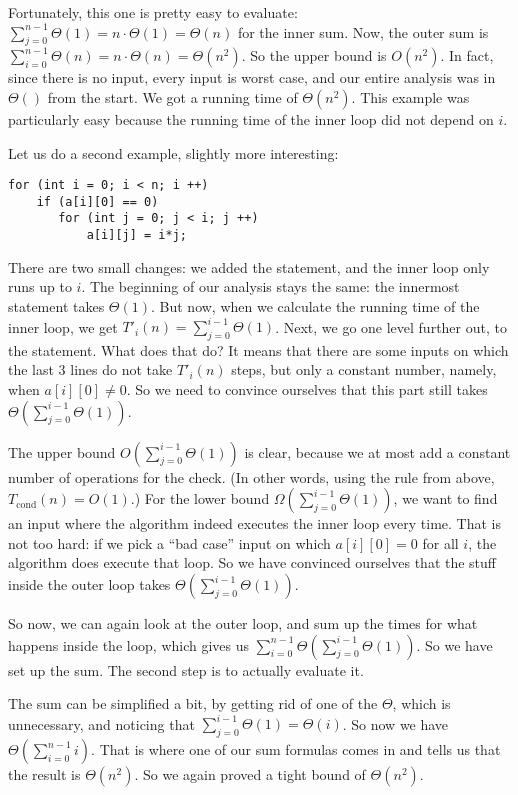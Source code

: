 Fortunately, this one is pretty easy to evaluate:
$\sum_{j=0}^{n-1} \Theta(1) = n \cdot \Theta(1) = \Theta(n)$ for the
inner sum. Now, the outer sum is 
$\sum_{i=0}^{n-1} \Theta(n) = n \cdot \Theta(n) = \Theta(n^2)$.
So the upper bound is $O(n^2)$. In fact, since there is no input,
every input is worst case, and our entire analysis was in $\Theta()$
from the start. We got a running time of $\Theta(n^2)$.
This example was particularly easy because the running time of the
inner loop did not depend on $i$.

\smallskip

Let us do a second example, slightly more interesting:
\begin{verbatim}
for (int i = 0; i < n; i ++)
    if (a[i][0] == 0)
       for (int j = 0; j < i; j ++)
           a[i][j] = i*j;
\end{verbatim}
There are two small changes: we added the  statement, and the
inner loop only runs up to $i$.
The beginning of our analysis stays the same:
the innermost statement takes $\Theta(1)$.
But now, when we calculate the running time of the inner loop, we get 
$T'_i(n) = \sum_{j=0}^{i-1} \Theta(1)$.
Next, we go one level further out, to the  statement.
What does that do? It means that there are some inputs on which the
last 3 lines do not take $T'_i(n)$ steps, but only a constant number,
namely, when $a[i][0] \neq 0$. So we need to convince ourselves that
this part still takes $\Theta(\sum_{j=0}^{i-1} \Theta(1))$.

The upper bound $O(\sum_{j=0}^{i-1} \Theta(1))$ is clear,
because we at most add a constant number of operations for the check.
(In other words, using the  rule from above, $T_{\text{cond}}(n) = O(1)$.)
For the lower bound $\Omega(\sum_{j=0}^{i-1} \Theta(1))$,
we want to find an input where the algorithm indeed executes the inner
loop every time. 
That is not too hard: if we pick a ``bad case'' input on which $a[i][0] =0$
for all $i$, the algorithm does execute that loop.
So we have convinced ourselves that the stuff inside the outer loop
takes $\Theta(\sum_{j=0}^{i-1} \Theta(1))$. 

So now, we can again look at the outer loop,
and sum up the times for what happens inside the loop, which gives us
$\sum_{i=0}^{n-1} \Theta(\sum_{j=0}^{i-1} \Theta(1))$.
So we have set up the sum.
The second step is to actually evaluate it.

The sum can be simplified a bit, by getting rid of one of the
$\Theta$, which is unnecessary, and noticing that 
$\sum_{j=0}^{i-1} \Theta(1) = \Theta(i)$.
So now we have $\Theta(\sum_{i=0}^{n-1} i)$.
That is where one of our sum formulas comes in and tells us that the
result is $\Theta(n^2)$.
So we again proved a tight bound of $\Theta(n^2)$.

